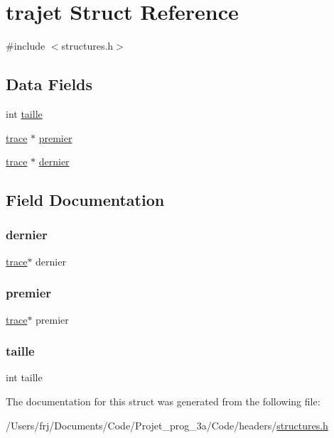 \hypertarget{structtrajet}{}\section{trajet Struct Reference}
\label{structtrajet}


{\ttfamily \#include $<$structures.\+h$>$}

\subsection*{Data Fields}
\begin{DoxyCompactItemize}
\item 
int \hyperlink{structtrajet_a29bf3fc0ffe4e72e45f0c84ab4f8cd1e}{taille}
\item 
\hyperlink{structtrace}{trace} $\ast$ \hyperlink{structtrajet_acc04ed138412836472c25ba9913c7474}{premier}
\item 
\hyperlink{structtrace}{trace} $\ast$ \hyperlink{structtrajet_a0f24911c2181642cd5909d397ac74b2c}{dernier}
\end{DoxyCompactItemize}


\subsection{Field Documentation}
\hypertarget{structtrajet_a0f24911c2181642cd5909d397ac74b2c}{}\label{structtrajet_a0f24911c2181642cd5909d397ac74b2c} 
\subsubsection{\texorpdfstring{dernier}{dernier}}
{\footnotesize\ttfamily \hyperlink{structtrace}{trace}$\ast$ dernier}

\hypertarget{structtrajet_acc04ed138412836472c25ba9913c7474}{}\label{structtrajet_acc04ed138412836472c25ba9913c7474} 
\subsubsection{\texorpdfstring{premier}{premier}}
{\footnotesize\ttfamily \hyperlink{structtrace}{trace}$\ast$ premier}

\hypertarget{structtrajet_a29bf3fc0ffe4e72e45f0c84ab4f8cd1e}{}\label{structtrajet_a29bf3fc0ffe4e72e45f0c84ab4f8cd1e} 
\subsubsection{\texorpdfstring{taille}{taille}}
{\footnotesize\ttfamily int taille}



The documentation for this struct was generated from the following file\+:\begin{DoxyCompactItemize}
\item 
/\+Users/frj/\+Documents/\+Code/\+Projet\+\_\+prog\+\_\+3a/\+Code/headers/\hyperlink{structures_8h}{structures.\+h}\end{DoxyCompactItemize}
